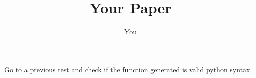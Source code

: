 \documentclass{article}
\title{Your Paper}
\author{You}
\begin{document}
Go to a previous test and check if the function generated is valid python syntax.
\end{document}
